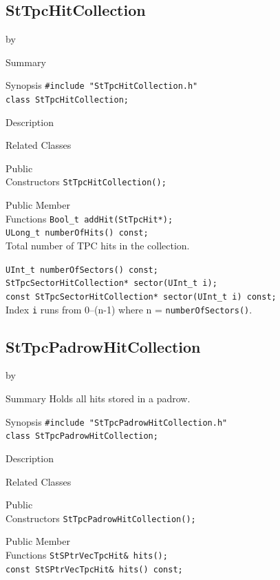 \documentclass[twoside]{article}
\newcommand{\entrylabel}[1]{\mbox{\textbf{{#1}}}\hfil}%
\newenvironment{entry}
{\begin{list}{}%
    {\renewcommand{\makelabel}{\entrylabel}%
     \setlength{\labelwidth}{90pt}%
     \setlength{\leftmargin}{\labelwidth}
     \advance\leftmargin by \labelsep%
      }%
    }%
  {\end{list}}
\newcommand{\Entrylabel}[1]%
{\raisebox{0pt}[1ex][0pt]{\makebox[\labelwidth][l]%
    {\parbox[t]{\labelwidth}{\hspace{0pt}\textbf{{#1}}}}}}
\newenvironment{Entry}%
{\renewcommand{\entrylabel}{\Entrylabel}\begin{entry}}%
  {\end{entry}}
\begin{document}
\subsection{StTpcHitCollection}
\label{sec:StTpcHitCollection}
\begin{Entry}
\item[Summary]
\item[Synopsis]
    \verb+#include "StTpcHitCollection.h"+\\
    \verb+class StTpcHitCollection;+\\
\item[Description]
\item[Related Classes]
\item[Public\\ Constructors]
    \verb+StTpcHitCollection();+\\
\item[Public Member\\ Functions]
    \verb+Bool_t addHit(StTpcHit*);+\\
    
    \verb+ULong_t numberOfHits() const;+\\
    Total number of TPC hits in the collection.
    
    \verb+UInt_t numberOfSectors() const;+\\

    \verb+StTpcSectorHitCollection* sector(UInt_t i);+\\
    \verb+const StTpcSectorHitCollection* sector(UInt_t i) const;+\\
    Index \texttt{i} runs from 0--(n-1) where n =
    \texttt{numberOfSectors()}.
\end{Entry}
\clearpage


\subsection{StTpcPadrowHitCollection}
\label{sec:StTpcPadrowHitCollection}
\begin{Entry}
\item[Summary] Holds all hits stored in a padrow.
\item[Synopsis]
    \verb+#include "StTpcPadrowHitCollection.h"+\\
    \verb+class StTpcPadrowHitCollection;+\\
\item[Description]
\item[Related Classes]
\item[Public\\ Constructors]
    \verb+StTpcPadrowHitCollection();+\\
\item[Public Member\\ Functions]
    \verb+StSPtrVecTpcHit& hits();+\\
    \verb+const StSPtrVecTpcHit& hits() const;+\\
\end{Entry}
\clearpage
\end{document}

